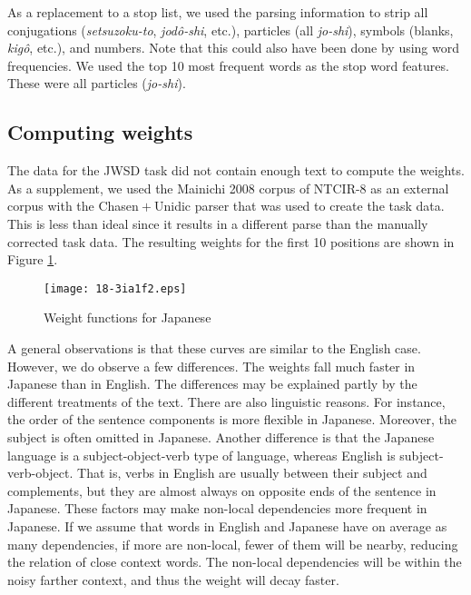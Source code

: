 \documentclass[english]{jnlp_1.4}
\begin{document}
As a replacement to a stop list, we used the parsing information to
strip all conjugations (\emph{setsuzoku-to}, \emph{jod\^{o}-shi},
etc.), particles (all \emph{jo-shi}), symbols (blanks, \emph{kig\^{o}},
etc.), and numbers. Note that this could also have been done by using
word frequencies. We used the top 10 most frequent words as the stop
word features. These were all particles (\emph{jo-shi}).


\subsection{Computing weights}

The data for the JWSD task did not contain enough text to compute
the weights. As a supplement, we used the Mainichi 2008 corpus of
NTCIR-8 as an external corpus with the Chasen${}+{}$Unidic parser that was
used to create the task data. This is less than ideal since it results
in a different parse than the manually corrected task data. The resulting
weights for the first 10 positions are shown in Figure \ref{fig:Weight-functions-for-japanese}.

\begin{figure}[t]
\begin{center}
\texttt{[image: 18-3ia1f2.eps]}
\end{center}
\caption{Weight functions for Japanese}
\label{fig:Weight-functions-for-japanese}
\end{figure}


A general observations is that these curves are similar to the English
case. However, we do observe a few differences. The weights fall much
faster in Japanese than in English. The differences may be explained
partly by the different treatments of the text. There are also linguistic
reasons. For instance, the order of the sentence components is more
flexible in Japanese. Moreover, the subject is often omitted in Japanese.
Another difference is that the Japanese language is a subject-object-verb
type of language, whereas English is subject-verb-object. That is,
verbs in English are usually between their subject and complements,
but they are almost always on opposite ends of the sentence in Japanese.
These factors may make non-local dependencies more frequent in Japanese.
If we assume that words in English and Japanese have on average as
many dependencies, if more are non-local, fewer of them will be nearby,
reducing the relation of close context words. The non-local dependencies
will be within the noisy farther context, and thus the weight will
decay faster.
\end{document}
